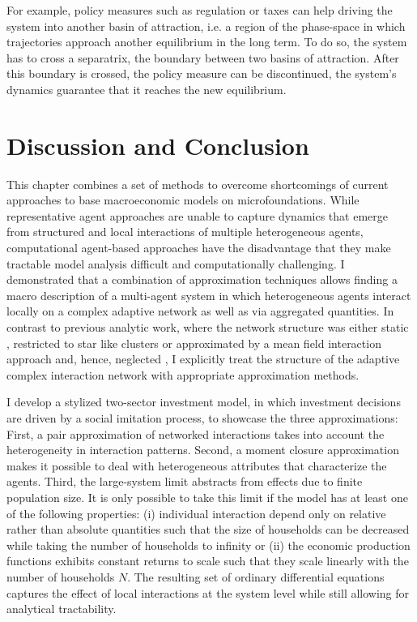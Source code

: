 For example, policy measures such as regulation or taxes can help driving the system into another basin of attraction, i.e. a region of the phase-space in which trajectories approach another equilibrium in the long term. To do so, the system has to cross a separatrix, the boundary between two basins of attraction.
After this boundary is crossed, the policy measure can be discontinued, the system's dynamics guarantee that it reaches the new equilibrium. 

\section{Discussion and Conclusion}
\label{sec:approx_conclusion}
This chapter combines a set of methods to overcome shortcomings of current approaches to base macroeconomic models on microfoundations.
While representative agent approaches are unable to capture dynamics that emerge from structured and local interactions of multiple heterogeneous agents, computational agent-based approaches have the disadvantage that they make tractable model analysis difficult and computationally challenging.
I demonstrated that a combination of approximation techniques allows finding a macro description of a multi-agent system in which heterogeneous agents interact locally on a complex adaptive network as well as via aggregated quantities. 
In contrast to previous analytic work, where the network structure was either static \cite{Lux2016}, restricted to star like clusters \cite{DiGuilmi2012} or approximated by a mean field interaction approach and, hence, neglected \citep{Aoki1998, Aoki2007, Alfarano2008a, DiGuilmi2008, Chiarella2011a}, I explicitly treat the structure of the adaptive complex interaction network with appropriate approximation methods.

I develop a stylized two-sector investment model, in which investment decisions are driven by a social imitation process, to showcase the three approximations:
First, a pair approximation of networked interactions takes into account the heterogeneity in interaction patterns.
Second, a moment closure approximation makes it possible to deal with heterogeneous attributes that characterize the agents.
Third, the large-system limit abstracts from effects due to finite population size.
It is only possible to take this limit if the model has at least one of the following properties: (i) individual interaction depend only on relative rather than absolute quantities such that the size of households can be decreased while taking the number of households to infinity or (ii) the economic production functions exhibits constant returns to scale such that they scale linearly with the number of households $N$.
The resulting set of ordinary differential equations captures the effect of local interactions at the system level while still allowing for analytical tractability.

